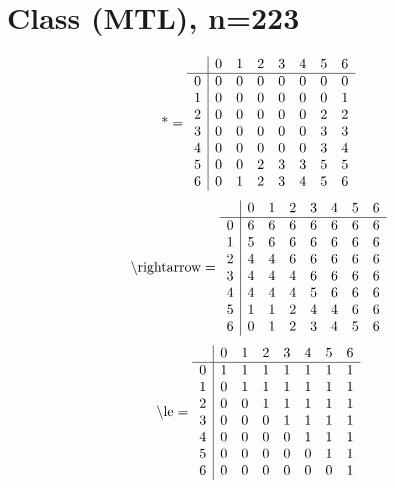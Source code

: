 \documentclass[11pt]{article}
\begin{document}
\section{Class (MTL), n=223}
\[\text{*} = 
\begin{array}{r | r r r r r r r}
 & 0 & 1 & 2 & 3 & 4 & 5 & 6 \\ \hline
0 & 0 & 0 & 0 & 0 & 0 & 0 & 0 \\
1 & 0 & 0 & 0 & 0 & 0 & 0 & 1 \\
2 & 0 & 0 & 0 & 0 & 0 & 2 & 2 \\
3 & 0 & 0 & 0 & 0 & 0 & 3 & 3 \\
4 & 0 & 0 & 0 & 0 & 0 & 3 & 4 \\
5 & 0 & 0 & 2 & 3 & 3 & 5 & 5 \\
6 & 0 & 1 & 2 & 3 & 4 & 5 & 6 \\
\end{array}
\]
\[\text{\textbackslash rightarrow} = 
\begin{array}{r | r r r r r r r}
 & 0 & 1 & 2 & 3 & 4 & 5 & 6 \\ \hline
0 & 6 & 6 & 6 & 6 & 6 & 6 & 6 \\
1 & 5 & 6 & 6 & 6 & 6 & 6 & 6 \\
2 & 4 & 4 & 6 & 6 & 6 & 6 & 6 \\
3 & 4 & 4 & 4 & 6 & 6 & 6 & 6 \\
4 & 4 & 4 & 4 & 5 & 6 & 6 & 6 \\
5 & 1 & 1 & 2 & 4 & 4 & 6 & 6 \\
6 & 0 & 1 & 2 & 3 & 4 & 5 & 6 \\
\end{array}
\]
\[\text{\textbackslash le} = 
\begin{array}{r | r r r r r r r}
 & 0 & 1 & 2 & 3 & 4 & 5 & 6 \\ \hline
0 & 1 & 1 & 1 & 1 & 1 & 1 & 1 \\
1 & 0 & 1 & 1 & 1 & 1 & 1 & 1 \\
2 & 0 & 0 & 1 & 1 & 1 & 1 & 1 \\
3 & 0 & 0 & 0 & 1 & 1 & 1 & 1 \\
4 & 0 & 0 & 0 & 0 & 1 & 1 & 1 \\
5 & 0 & 0 & 0 & 0 & 0 & 1 & 1 \\
6 & 0 & 0 & 0 & 0 & 0 & 0 & 1 \\
\end{array}
\]
\end{document}
